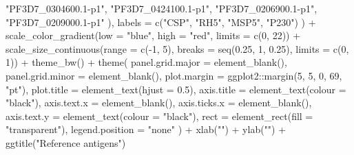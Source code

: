\documentclass[
  11pt,
  oneside]{book}
\newenvironment{Shaded}{\begin{snugshade}}{\end{snugshade}}
\newcommand{\AttributeTok}[1]{\textcolor[rgb]{0.77,0.63,0.00}{#1}}
\newcommand{\DecValTok}[1]{\textcolor[rgb]{0.00,0.00,0.81}{#1}}
\newcommand{\FloatTok}[1]{\textcolor[rgb]{0.00,0.00,0.81}{#1}}
\newcommand{\FunctionTok}[1]{\textcolor[rgb]{0.00,0.00,0.00}{#1}}
\newcommand{\NormalTok}[1]{#1}
\newcommand{\SpecialCharTok}[1]{\textcolor[rgb]{0.00,0.00,0.00}{#1}}
\newcommand{\StringTok}[1]{\textcolor[rgb]{0.31,0.60,0.02}{#1}}
\begin{document}
\begin{Shaded}
\begin{Highlighting}[]
      \StringTok{"PF3D7\_0304600.1{-}p1"}\NormalTok{, }\StringTok{"PF3D7\_0424100.1{-}p1"}\NormalTok{,}
      \StringTok{"PF3D7\_0206900.1{-}p1"}\NormalTok{, }\StringTok{"PF3D7\_0209000.1{-}p1"}
\NormalTok{    ),}
    \AttributeTok{labels =} \FunctionTok{c}\NormalTok{(}\StringTok{"CSP"}\NormalTok{, }\StringTok{"RH5"}\NormalTok{, }\StringTok{"MSP5"}\NormalTok{, }\StringTok{"P230"}\NormalTok{)}
\NormalTok{  ) }\SpecialCharTok{+}
  \FunctionTok{scale\_color\_gradient}\NormalTok{(}\AttributeTok{low =} \StringTok{"blue"}\NormalTok{, }\AttributeTok{high =} \StringTok{"red"}\NormalTok{, }\AttributeTok{limits =} \FunctionTok{c}\NormalTok{(}\DecValTok{0}\NormalTok{, }\DecValTok{22}\NormalTok{)) }\SpecialCharTok{+}
  \FunctionTok{scale\_size\_continuous}\NormalTok{(}\AttributeTok{range =} \FunctionTok{c}\NormalTok{(}\SpecialCharTok{{-}}\DecValTok{1}\NormalTok{, }\DecValTok{5}\NormalTok{), }\AttributeTok{breaks =} \FunctionTok{seq}\NormalTok{(}\FloatTok{0.25}\NormalTok{, }\DecValTok{1}\NormalTok{, }\FloatTok{0.25}\NormalTok{), }\AttributeTok{limits =} \FunctionTok{c}\NormalTok{(}\DecValTok{0}\NormalTok{, }\DecValTok{1}\NormalTok{)) }\SpecialCharTok{+}
  \FunctionTok{theme\_bw}\NormalTok{() }\SpecialCharTok{+}
  \FunctionTok{theme}\NormalTok{(}
    \AttributeTok{panel.grid.major =} \FunctionTok{element\_blank}\NormalTok{(),}
    \AttributeTok{panel.grid.minor =} \FunctionTok{element\_blank}\NormalTok{(),}
    \AttributeTok{plot.margin =}\NormalTok{ ggplot2}\SpecialCharTok{::}\FunctionTok{margin}\NormalTok{(}\DecValTok{5}\NormalTok{, }\DecValTok{5}\NormalTok{, }\DecValTok{0}\NormalTok{, }\DecValTok{69}\NormalTok{, }\StringTok{"pt"}\NormalTok{),}
    \AttributeTok{plot.title =} \FunctionTok{element\_text}\NormalTok{(}\AttributeTok{hjust =} \FloatTok{0.5}\NormalTok{),}
    \AttributeTok{axis.title =} \FunctionTok{element\_text}\NormalTok{(}\AttributeTok{colour =} \StringTok{"black"}\NormalTok{),}
    \AttributeTok{axis.text.x =} \FunctionTok{element\_blank}\NormalTok{(),}
    \AttributeTok{axis.ticks.x =} \FunctionTok{element\_blank}\NormalTok{(),}
    \AttributeTok{axis.text.y =} \FunctionTok{element\_text}\NormalTok{(}\AttributeTok{colour =} \StringTok{"black"}\NormalTok{),}
    \AttributeTok{rect =} \FunctionTok{element\_rect}\NormalTok{(}\AttributeTok{fill =} \StringTok{"transparent"}\NormalTok{),}
    \AttributeTok{legend.position =} \StringTok{"none"}
\NormalTok{  ) }\SpecialCharTok{+}
  \FunctionTok{xlab}\NormalTok{(}\StringTok{""}\NormalTok{) }\SpecialCharTok{+}
  \FunctionTok{ylab}\NormalTok{(}\StringTok{""}\NormalTok{) }\SpecialCharTok{+}
  \FunctionTok{ggtitle}\NormalTok{(}\StringTok{"Reference antigens"}\NormalTok{)}
\end{Highlighting}
\end{Shaded}
\end{document}
